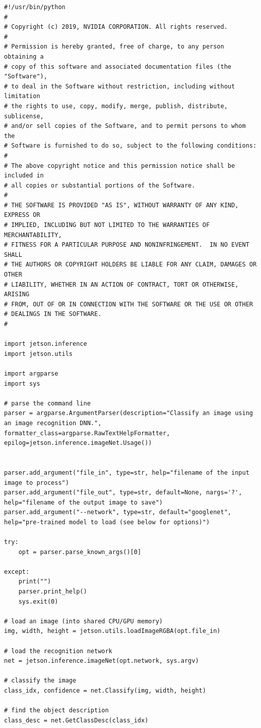 \begin{lstlisting}
#!/usr/bin/python
#
# Copyright (c) 2019, NVIDIA CORPORATION. All rights reserved.
#
# Permission is hereby granted, free of charge, to any person obtaining a
# copy of this software and associated documentation files (the "Software"),
# to deal in the Software without restriction, including without limitation
# the rights to use, copy, modify, merge, publish, distribute, sublicense,
# and/or sell copies of the Software, and to permit persons to whom the
# Software is furnished to do so, subject to the following conditions:
#
# The above copyright notice and this permission notice shall be included in
# all copies or substantial portions of the Software.
#
# THE SOFTWARE IS PROVIDED "AS IS", WITHOUT WARRANTY OF ANY KIND, EXPRESS OR
# IMPLIED, INCLUDING BUT NOT LIMITED TO THE WARRANTIES OF MERCHANTABILITY,
# FITNESS FOR A PARTICULAR PURPOSE AND NONINFRINGEMENT.  IN NO EVENT SHALL
# THE AUTHORS OR COPYRIGHT HOLDERS BE LIABLE FOR ANY CLAIM, DAMAGES OR OTHER
# LIABILITY, WHETHER IN AN ACTION OF CONTRACT, TORT OR OTHERWISE, ARISING
# FROM, OUT OF OR IN CONNECTION WITH THE SOFTWARE OR THE USE OR OTHER
# DEALINGS IN THE SOFTWARE.
#

import jetson.inference
import jetson.utils

import argparse
import sys

# parse the command line
parser = argparse.ArgumentParser(description="Classify an image using an image recognition DNN.", formatter_class=argparse.RawTextHelpFormatter, epilog=jetson.inference.imageNet.Usage())


parser.add_argument("file_in", type=str, help="filename of the input image to process")
parser.add_argument("file_out", type=str, default=None, nargs='?', help="filename of the output image to save")
parser.add_argument("--network", type=str, default="googlenet", help="pre-trained model to load (see below for options)")

try:
	opt = parser.parse_known_args()[0]

except:
	print("")
	parser.print_help()
	sys.exit(0)

# load an image (into shared CPU/GPU memory)
img, width, height = jetson.utils.loadImageRGBA(opt.file_in)

# load the recognition network
net = jetson.inference.imageNet(opt.network, sys.argv)

# classify the image
class_idx, confidence = net.Classify(img, width, height)

# find the object description
class_desc = net.GetClassDesc(class_idx)


\end{lstlisting}
